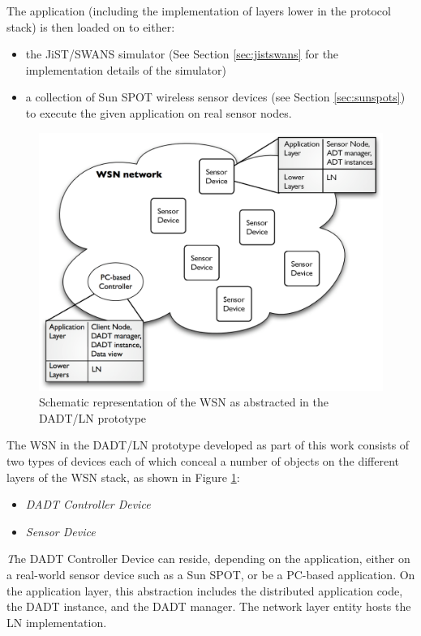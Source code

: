The application (including the implementation of layers lower in the protocol
stack) is then loaded on to either:
\begin{itemize}
\item the JiST/SWANS simulator \cite{barr_JIST:2005, barr_SWANS} (See Section
\ref{sec:jistswans} for the implementation details of the simulator) 
\item a collection of Sun SPOT wireless sensor devices
\cite{simon_squawk:2006} (see Section \ref{sec:sunspots}) to execute the given 
application on real sensor nodes.
\end{itemize}

\begin{figure}
\centering
\includegraphics[scale=0.55]{img/DADTLN_glossary.eps} 
\caption[WSN in DADT/LN prototype]{Schematic representation of the WSN as
abstracted in the DADT/LN prototype}
\label{Fig:DADTLN_glossary}
\end{figure} 

The WSN in the DADT/LN prototype developed as part of
this work consists of two types of devices each of which conceal a number
of objects on the different layers of the WSN stack, as shown in Figure
\ref{Fig:DADTLN_glossary}:

\begin{itemize}
  \item \emph{DADT Controller Device}
  \item \emph{Sensor Device}
\end{itemize}  
   
\emph The {DADT Controller Device} can reside, depending on the
application, either on a real-world sensor device such as a Sun
SPOT, or be a PC-based application. On the application layer, this
abstraction includes the distributed application code, the DADT instance, and the DADT manager. The network layer entity hosts the LN implementation.
  
